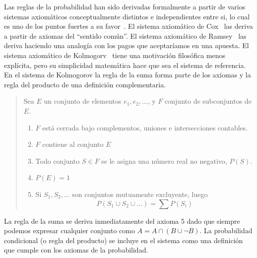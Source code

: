 \documentclass[a4paper,11pt]{book}
\theoremstyle{definition}
\begin{document}
Las reglas de la probabilidad han sido derivadas formalmente a partir de varios sistemas axiom\'aticos conceptualmente distintos e independientes entre si, lo cual es uno de los puntos fuertes a su favor~\cite{halpern2017}.
%
El sistema axiom\'atico de Cox~\cite{cox} las deriva a partir de axiomas del ``sentido común''.
%
El sistema axiom\'atico de Ramsey~\cite{ramsey} las deriva haciendo una analog\'ia con los pagos que aceptar\'iamos en una apuesta.
%
El sistema axiom\'atico de Kolmogorv~\cite{kolmogorov} tiene una motivaci\'on filos\'ofica menos expl\'icita, pero su simplicidad matem\'atica hace que sea el sistema de referencia.
%
En el sistema de Kolmogorov la regla de la suma forma parte de los axiomas y la regla del producto de una definici\'on complementaria.
%
\begin{quotation}
Sea $E$ un conjunto de elementos $e_1, e_2, \dots$, y $F$ conjunto de subconjuntos de $E$.
%
\begin{enumerate}\itemsep-0.05cm
\item $F$ est\'a cerrada bajo complementos, uniones e intersecciones contables.
\item $F$ contiene al conjunto $E$
\item Todo conjunto $S \in F$ se le asigna una n\'umero real no negativo, $P(S)$.
\item $P(E) = 1$
\item Si $S_1, S_2, \dots$ son conjuntos mutuamente excluyente, luego
\begin{equation}
P(S_1 \cup S_2 \cup \dots ) = \sum P(S_i)
\end{equation}
\end{enumerate}
\end{quotation}
%
La regla de la suma se deriva inmediatamente del axioma 5 dado que siempre podemos expresar cualquier conjunto como $A = A \cap (B \cup \neg B)$.
%
La probabilidad condicional (o regla del producto) se incluye en el sistema como una definici\'on que cumple con los axiomas de la probabilidad.

\end{document}
